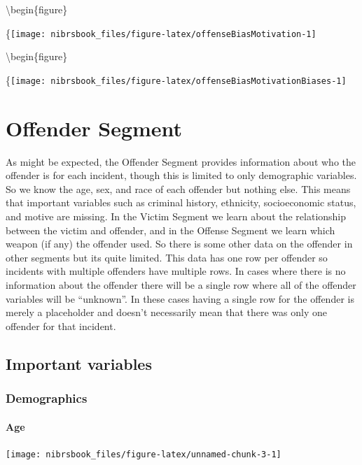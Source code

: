 \documentclass[
  12pt,
  openany]{book}
\begin{document}
\textbackslash begin\{figure\}

\{\centering \texttt{[image: nibrsbook\_files/figure-latex/offenseBiasMotivation-1]}

\textbackslash begin\{figure\}

\{\centering \texttt{[image: nibrsbook\_files/figure-latex/offenseBiasMotivationBiases-1]}

\hypertarget{offender-segment}{%
\chapter{Offender Segment}\label{offender-segment}}

As might be expected, the Offender Segment provides information about who the offender is for each incident, though this is limited to only demographic variables. So we know the age, sex, and race of each offender but nothing else. This means that important variables such as criminal history, ethnicity, socioeconomic status, and motive are missing. In the Victim Segment we learn about the relationship between the victim and offender, and in the Offense Segment we learn which weapon (if any) the offender used. So there is some other data on the offender in other segments but its quite limited. This data has one row per offender so incidents with multiple offenders have multiple rows. In cases where there is no information about the offender there will be a single row where all of the offender variables will be ``unknown''. In these cases having a single row for the offender is merely a placeholder and doesn't necessarily mean that there was only one offender for that incident.

\hypertarget{important-variables-2}{%
\section{Important variables}\label{important-variables-2}}

\hypertarget{demographics}{%
\subsection{Demographics}\label{demographics}}

\hypertarget{age}{%
\subsubsection{Age}\label{age}}

\begin{center}\texttt{[image: nibrsbook\_files/figure-latex/unnamed-chunk-3-1]} \end{center}
\end{document}
